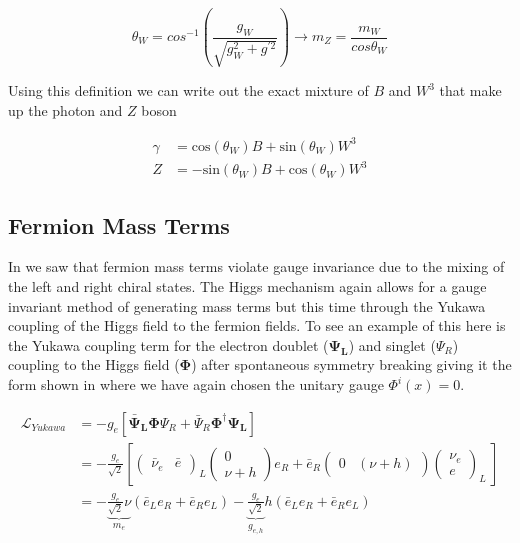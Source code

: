\begin{equation}
\theta_W = cos^{-1}\left( \frac{g_{W}}{\sqrt{g_{W}^{2}+g^{'2}}} \right) \rightarrow m_{Z} =
\frac{m_{W}}{cos{\theta_{W}}}
\end{equation}

Using this definition we can write out the exact mixture of $B$ and $W^{3}$ that
make up the photon and $Z$ boson

\begin{align}
\gamma &= \text{cos}(\theta_{W})B + \text{sin}(\theta_{W})W^{3} \\
Z &= -\text{sin}(\theta_{W})B + \text{cos}(\theta_{W})W^{3}
\end{align}

\subsection{Fermion Mass Terms} \label{sec:theory:fermion_mass}

In  we saw that fermion mass terms violate gauge
invariance due to the mixing of the left and right chiral states.  The Higgs
mechanism again allows for a gauge invariant method of generating mass terms but
this time through the Yukawa coupling of the Higgs field to the fermion fields.
To see an example of this here is the Yukawa coupling term for the electron
doublet ($\boldsymbol{\Psi_L}$) and singlet ($\Psi_R$) coupling to the Higgs
field ($\boldsymbol{\Phi}$) after spontaneous symmetry breaking giving it the
form shown in  where we have again chosen
the unitary gauge $\Phi^{i}(x) = 0$.

\begin{align}
\mathcal{L}_{Yukawa} &= - g_{e} \left[ \boldsymbol{\bar{\Psi}_L}
\boldsymbol{\Phi} \Psi_R + \bar{\Psi}_{R} \boldsymbol{\Phi}^{\dagger} \boldsymbol{\Psi_L}
\right] \\ &= - \frac{g_{e}}{\sqrt{2}} \left[ \left( \begin{matrix}
\bar{\nu}_{e} & \bar{e} \end{matrix} \right)_L \left( \begin{matrix} 0 \\ \nu +
h \end{matrix} \right) e_{R} + \bar{e}_{R} \left( \begin{matrix} 0 & (\nu + h)
\end{matrix} \right) \left( \begin{matrix} \nu_{e} \\ e \end{matrix} \right)_L \ \right] \\ &= - \underbrace{\frac{g_{e}}{\sqrt{2}}
\nu}_{m_{e}} \left( \bar{e}_{L}e_{R} + \bar{e}_{R}e_{L}  \right)
- \underbrace{\frac{g_{e}}{\sqrt{2}}}_{g_{e,h}} h \left(
\bar{e}_{L}e_{R} + \bar{e}_{R}e_{L}  \right) 
\end{align}

